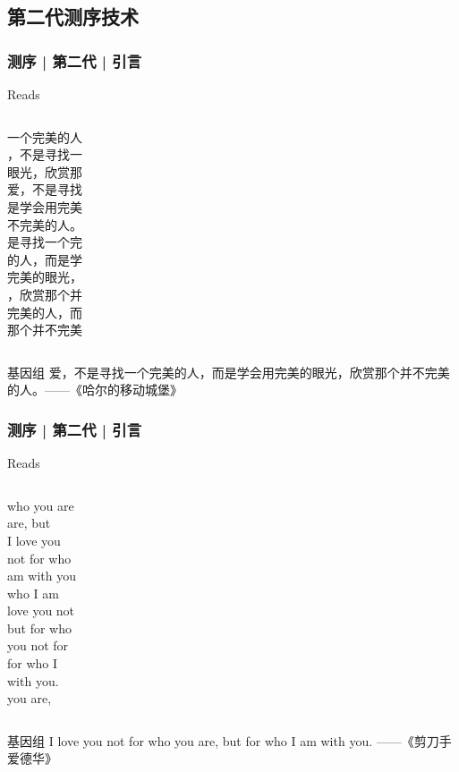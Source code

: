 \subsection{第二代测序技术}
\begin{frame}
  \frametitle{测序 | 第二代 | 引言}
  \begin{block}{Reads}
    \begin{columns}
一个完美的人 \\ ，不是寻找一 \\ 眼光，欣赏那 \\ 爱，不是寻找 \\ 是学会用完美 \\  不完美的人。 \\
是寻找一个完 \\ 的人，而是学 \\ 完美的眼光， \\ ，欣赏那个并 \\ 完美的人，而 \\ 那个并不完美  \\
    \end{columns}
  \end{block}
  \pause
  \pause
  \pause
  \pause
  \begin{block}{基因组}
    爱，不是寻找一个完美的人，而是学会用完美的眼光，欣赏那个并不完美的人。——《哈尔的移动城堡》
  \end{block}
\end{frame}

\begin{frame}
  \frametitle{测序 | 第二代 | 引言}
  \begin{block}{Reads}
    \begin{columns}
      who you are \\ are, but \\ I love you \\ not for who \\ am with you \\ who I am \\
      love you not \\ but for who \\ you not for \\ for who I \\ with you. \\ you are, \\
    \end{columns}
  \end{block}
  \pause
  \pause
  \pause
  \pause
  \begin{block}{基因组}
    I love you not for who you are, but for who I am with you. ——《剪刀手爱德华》
  \end{block}
\end{frame}

